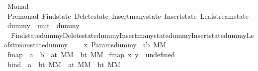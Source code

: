 %
\begin{isabellebody}%
%
%
\isadelimtheory
%
\endisadelimtheory
%
\isatagtheory
{}\isamarkupfalse%
\ Monad\isanewline
{}\ Pre{\isacharunderscore}monad\ Find{\isacharunderscore}state\ Delete{\isacharunderscore}state\ Insert{\isacharunderscore}many{\isacharunderscore}state\ Insert{\isacharunderscore}state\ Leaf{\isacharunderscore}stream{\isacharunderscore}state\isanewline
{}%
\endisatagtheory
{\isafoldtheory}%
%
\isadelimtheory
\isanewline
%
\endisadelimtheory
\isanewline
\isanewline
{}\isamarkupfalse%
\ dummy\ {\isacharcolon}{\isacharcolon}\ {\isachardoublequoteopen}unit{\isachardoublequoteclose}\ \ {\isachardoublequoteopen}dummy{\isacharequal}\isanewline
\ \ {\isacharparenleft}Find{\isacharunderscore}state{\isachardot}dummy{\isacharcomma}Delete{\isacharunderscore}state{\isachardot}dummy{\isacharcomma}Insert{\isacharunderscore}many{\isacharunderscore}state{\isachardot}dummy{\isacharcomma}Insert{\isacharunderscore}state{\isachardot}dummy{\isacharcomma}Leaf{\isacharunderscore}stream{\isacharunderscore}state{\isachardot}dummy{\isacharparenright}\isanewline
\ \ {\isacharbar}{\isachargreater}\ {\isacharparenleft}{\isacharpercent}\ x{\isachardot}\ Params{\isachardot}dummy{\isacharparenright}{\isachardoublequoteclose}\isanewline
\isanewline
\isanewline
\isanewline
\isanewline
\isanewline
\isanewline
\isanewline
\isanewline
\isanewline
\isanewline
\isanewline
\isanewline
\isanewline
\isanewline
\isanewline
\isanewline
\isanewline
\isanewline
\isanewline
{}\isamarkupfalse%
\ {\isacharparenleft}{\isacharprime}a{\isacharcomma}{\isacharprime}b{\isacharparenright}\ MM\isanewline
\isanewline
{}\isamarkupfalse%
\ fmap\ {\isacharcolon}{\isacharcolon}\ {\isachardoublequoteopen}{\isacharparenleft}{\isacharprime}a\ {\isasymRightarrow}\ {\isacharprime}b{\isacharparenright}\ {\isasymRightarrow}\ {\isacharparenleft}{\isacharprime}a{\isacharcomma}{\isacharprime}t{\isacharparenright}\ MM\ {\isasymRightarrow}\ {\isacharparenleft}{\isacharprime}b{\isacharcomma}{\isacharprime}t{\isacharparenright}\ MM{\isachardoublequoteclose}\ \isanewline
{\isachardoublequoteopen}fmap\ x\ y\ {\isacharequal}\ undefined{\isachardoublequoteclose}\isanewline
\isanewline
{}\isamarkupfalse%
\ bind\ {\isacharcolon}{\isacharcolon}\ {\isachardoublequoteopen}{\isacharparenleft}{\isacharprime}a\ {\isasymRightarrow}\ {\isacharparenleft}{\isacharprime}b{\isacharcomma}{\isacharprime}t{\isacharparenright}\ MM{\isacharparenright}\ {\isasymRightarrow}\ {\isacharparenleft}{\isacharprime}a{\isacharcomma}{\isacharprime}t{\isacharparenright}\ MM\ {\isasymRightarrow}\ {\isacharparenleft}{\isacharprime}b{\isacharcomma}{\isacharprime}t{\isacharparenright}\ MM{\isachardoublequoteclose}\ \isanewline

\end{isabellebody}
